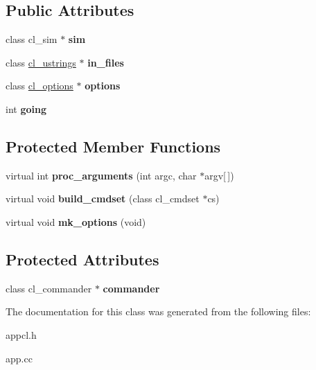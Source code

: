 \subsection*{Public Attributes}
\begin{DoxyCompactItemize}
\item 
\hypertarget{classcl__app_a94eb36e019d36f6336ad62862c1a25c2}{
class cl\_\-sim $\ast$ {\bfseries sim}}
\label{classcl__app_a94eb36e019d36f6336ad62862c1a25c2}

\item 
\hypertarget{classcl__app_a4882666f7131e7b1e81cc9fc8fca6403}{
class \hyperlink{classcl__ustrings}{cl\_\-ustrings} $\ast$ {\bfseries in\_\-files}}
\label{classcl__app_a4882666f7131e7b1e81cc9fc8fca6403}

\item 
\hypertarget{classcl__app_aba6e14ee58a1edb482a1b405c0cfd149}{
class \hyperlink{classcl__options}{cl\_\-options} $\ast$ {\bfseries options}}
\label{classcl__app_aba6e14ee58a1edb482a1b405c0cfd149}

\item 
\hypertarget{classcl__app_af9769001edcf99f03f1d93b2e7b4e589}{
int {\bfseries going}}
\label{classcl__app_af9769001edcf99f03f1d93b2e7b4e589}

\end{DoxyCompactItemize}
\subsection*{Protected Member Functions}
\begin{DoxyCompactItemize}
\item 
\hypertarget{classcl__app_a8b96791b0d866b1f3ffa2b789c65f193}{
virtual int {\bfseries proc\_\-arguments} (int argc, char $\ast$argv\mbox{[}$\,$\mbox{]})}
\label{classcl__app_a8b96791b0d866b1f3ffa2b789c65f193}

\item 
\hypertarget{classcl__app_a8d483117b05cc19fc826fa47ec024e9f}{
virtual void {\bfseries build\_\-cmdset} (class cl\_\-cmdset $\ast$cs)}
\label{classcl__app_a8d483117b05cc19fc826fa47ec024e9f}

\item 
\hypertarget{classcl__app_af661a94adb2681eb930f2d4bcd0724e6}{
virtual void {\bfseries mk\_\-options} (void)}
\label{classcl__app_af661a94adb2681eb930f2d4bcd0724e6}

\end{DoxyCompactItemize}
\subsection*{Protected Attributes}
\begin{DoxyCompactItemize}
\item 
\hypertarget{classcl__app_acb07f7525b77148df0d6e73587d6dbea}{
class cl\_\-commander $\ast$ {\bfseries commander}}
\label{classcl__app_acb07f7525b77148df0d6e73587d6dbea}

\end{DoxyCompactItemize}


The documentation for this class was generated from the following files:\begin{DoxyCompactItemize}
\item 
appcl.h\item 
app.cc\end{DoxyCompactItemize}
